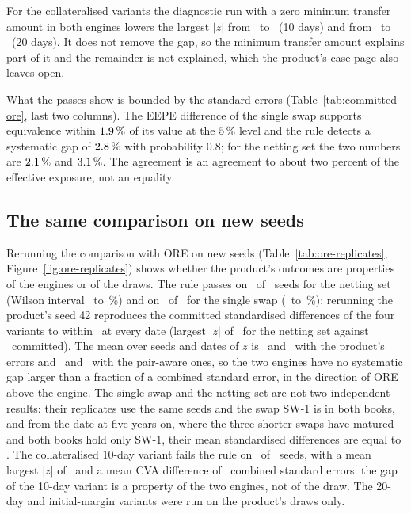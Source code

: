 For the collateralised variants the diagnostic run with a zero minimum transfer amount in both engines lowers the largest $\lvert z\rvert$ from \nCsaTenMaxZ\ to \nCsaTenMtaZ\ (10 days) and from \nCsaTwentyMaxZ\ to \nCsaTwentyMtaZ\ (20 days). It does not remove the gap, so the minimum transfer amount explains part of it and the remainder is not explained, which the product's case page also leaves open.

What the passes show is bounded by the standard errors (Table~\ref{tab:committed-ore}, last two columns). The EEPE difference of the single swap supports equivalence within $1.9\,\%$ of its value at the $5\,\%$ level and the rule detects a systematic gap of $2.8\,\%$ with probability $0.8$; for the netting set the two numbers are $2.1\,\%$ and $3.1\,\%$. The agreement is an agreement to about two percent of the effective exposure, not an equality.

\subsection{The same comparison on new seeds}
\label{sec:results-seeds}

Rerunning the comparison with ORE on new seeds (Table~\ref{tab:ore-replicates}, Figure~\ref{fig:ore-replicates}) shows whether the product's outcomes are properties of the engines or of the draws. The rule passes on \nReplNetPass\ of \nReplNetN\ seeds for the netting set (Wilson interval \nReplNetLo\ to \nReplNetHi\,\%) and on \nReplSinPass\ of \nReplSinN\ for the single swap (\nReplSinLo\ to \nReplSinHi\,\%); rerunning the product's seed 42 reproduces the committed standardised differences of the four variants to within \nSeedFortyTwoGap\ at every date (largest $\lvert z\rvert$ of \nSeedFortyTwoNetting\ for the netting set against \nNettingMaxZ\ committed). The mean over seeds and dates of $z$ is \nReplNetMeanZ\ and \nReplSinMeanZ\ with the product's errors and \nReplNetMeanZPair\ and \nReplSinMeanZPair\ with the pair-aware ones, so the two engines have no systematic gap larger than a fraction of a combined standard error, in the direction of ORE above the engine. The single swap and the netting set are not two independent results: their replicates use the same seeds and the swap SW-1 is in both books, and from the date at five years on, where the three shorter swaps have matured and both books hold only SW-1, their mean standardised differences are equal to \nSharedMeanGap. The collateralised 10-day variant fails the rule on \nReplCsaFail\ of \nReplCsaN\ seeds, with a mean largest $\lvert z\rvert$ of \nReplCsaMaxZ\ and a mean CVA difference of \nReplCsaCvaZ\ combined standard errors: the gap of the 10-day variant is a property of the two engines, not of the draw. The 20-day and initial-margin variants were run on the product's draws only.


